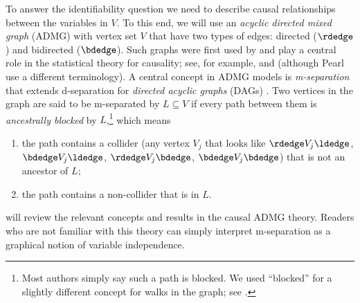 \documentclass[12pt,a4paper]{article}
\theoremstyle{definition}
\begin{document}
To answer the identifiability question we need to describe causal
relationships between the variables in $V$. To this end, we will
use an \emph{acyclic directed mixed graph} (ADMG) with vertex
set $V$ that have two types of edges: directed ($\rdedge$) and
bidirected ($\bdedge$). Such graphs were first used by
\textcite{wright_1934} and play a central role in the
statistical theory for causality; see, for example,
\textcite{pearl2009} %
and \textcite{richardson_nested_2023} (although Pearl use a different
terminology). %
A central concept in ADMG models is
\emph{m-separation} \parencite{richardson_markov_2003} that extends
d-separation for \emph{directed acyclic graphs} (DAGs)
\parencite{pearl2009}. Two vertices in the graph are said to be
m-separated by $L \subseteq V$ if every path between them is \emph{ancestrally
  blocked} by $L$,\footnote{Most authors simply say such a path is blocked. We
used ``blocked'' for a slightly different concept for walks in the
graph; see .} which means
\begin{enumerate}
    \item[i)] the path contains a collider (any vertex $V_j$ that
      looks like $\rdedge V_j \ldedge$, $\bdedge V_j \ldedge$, $\rdedge V_j \bdedge$,
      $\bdedge V_j \bdedge$) that is not an ancestor of
      $L$; 
    \item[ii)] the path contains a non-collider that is in $L$.
    \end{enumerate}
 will review the relevant concepts and results in the
causal ADMG theory. Readers who are not familiar with this theory can simply interpret m-separation as a graphical notion of variable
independence. %
\end{document}
